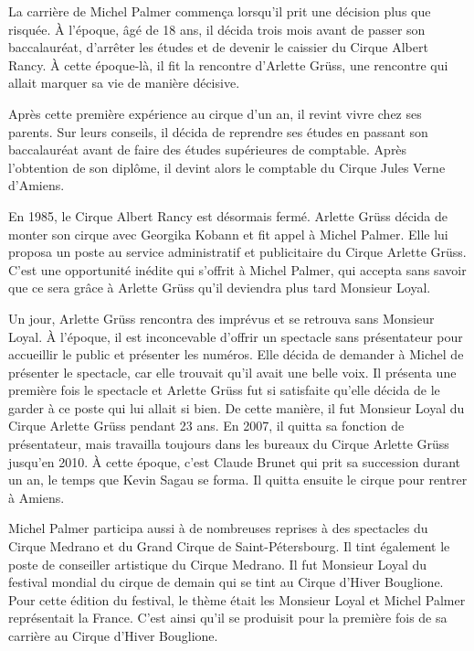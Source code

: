 La carrière de Michel Palmer commença lorsqu’il prit une décision plus que risquée. À l’époque, âgé de 18 ans, il décida trois mois avant de passer son baccalauréat, d’arrêter les études et de devenir le caissier du Cirque Albert Rancy. À cette époque-là, il fit la rencontre d’Arlette Grüss, une rencontre qui allait marquer sa vie de manière décisive.

Après cette première expérience au cirque d’un an, il revint vivre chez ses parents. Sur leurs conseils, il décida de reprendre ses études en passant son baccalauréat avant de faire des études supérieures de comptable. Après l’obtention de son diplôme, il devint alors le comptable du Cirque Jules Verne d’Amiens.

En 1985, le Cirque Albert Rancy est désormais fermé. Arlette Grüss décida de monter son cirque avec Georgika Kobann et fit appel à Michel Palmer. Elle lui proposa un poste au service administratif et publicitaire du Cirque Arlette Grüss. C’est une opportunité inédite qui s’offrit à Michel Palmer, qui accepta sans savoir que ce sera grâce à Arlette Grüss qu’il deviendra plus tard Monsieur Loyal.

Un jour, Arlette Grüss rencontra des imprévus et se retrouva sans Monsieur Loyal. À l’époque, il est inconcevable d’offrir un spectacle sans présentateur pour accueillir le public et présenter les numéros. Elle décida de demander à Michel de présenter le spectacle, car elle trouvait qu’il avait une belle voix. Il présenta une première fois le spectacle et Arlette Grüss fut si satisfaite qu’elle décida de le garder à ce poste qui lui allait si bien. De cette manière, il fut Monsieur Loyal du Cirque Arlette Grüss pendant 23 ans. En 2007, il quitta sa fonction de présentateur, mais travailla toujours dans les bureaux du Cirque Arlette Grüss jusqu’en 2010. À cette époque, c’est Claude Brunet qui prit sa succession durant un an, le temps que Kevin Sagau se forma. Il quitta ensuite le cirque pour rentrer à Amiens.

Michel Palmer participa aussi à de nombreuses reprises à des spectacles du Cirque Medrano et du Grand Cirque de Saint-Pétersbourg. Il tint également le poste de conseiller artistique du Cirque Medrano. Il fut Monsieur Loyal du festival mondial du cirque de demain qui se tint au Cirque d’Hiver Bouglione. Pour cette édition du festival, le thème était les Monsieur Loyal et Michel Palmer représentait la France. C’est ainsi qu’il se produisit pour la première fois de sa carrière au Cirque d’Hiver Bouglione.

